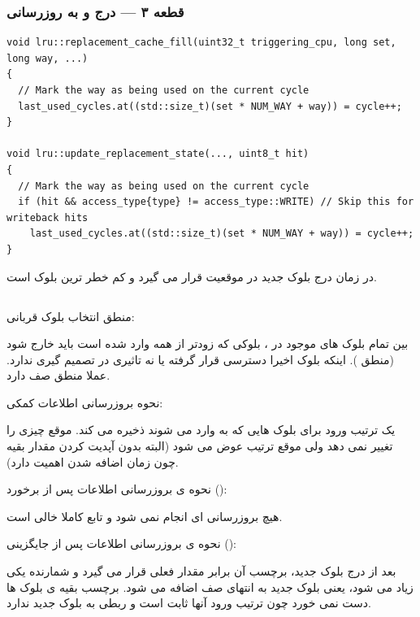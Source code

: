 \documentclass[12pt,a4paper]{article}
\begin{document}
\subsubsection{قطعه ۳ — درج و به روزرسانی}

\begin{latin}
\begin{lstlisting}
void lru::replacement_cache_fill(uint32_t triggering_cpu, long set, long way, ...)
{
  // Mark the way as being used on the current cycle
  last_used_cycles.at((std::size_t)(set * NUM_WAY + way)) = cycle++;
}

void lru::update_replacement_state(..., uint8_t hit)
{
  // Mark the way as being used on the current cycle
  if (hit && access_type{type} != access_type::WRITE) // Skip this for writeback hits
    last_used_cycles.at((std::size_t)(set * NUM_WAY + way)) = cycle++;
}
\end{lstlisting}
\end{latin}

در زمان درج بلوک جدید در موقعیت  قرار می گیرد و کم خطر ترین بلوک  است.

\subsection{}

منطق انتخاب بلوک قربانی:

بین تمام بلوک های موجود در ، بلوکی که زودتر از همه وارد شده است باید خارج شود (منطق ). اینکه بلوک اخیرا دسترسی قرار گرفته یا نه تاثیری در تصمیم گیری ندارد. عملا منطق صف دارد.

نحوه بروزرسانی اطلاعات کمکی:

یک ترتیب ورود برای بلوک هایی که به  وارد می شوند ذخیره می کند. موقع  چیزی را تغییر نمی دهد ولی موقع  ترتیب عوض می شود (البته بدون آپدیت کردن مقدار بقیه چون زمان اضافه شدن اهمیت دارد).

نحوه ی بروزرسانی اطلاعات پس از برخورد ():

هیچ بروزرسانی ای انجام نمی شود و تابع  کاملا خالی است.

نحوه ی بروزرسانی اطلاعات پس از جایگزینی ():

بعد از درج بلوک جدید، برچسب آن  برابر مقدار فعلی  قرار می گیرد و شمارنده یکی زیاد می شود، یعنی بلوک جدید به انتهای صف اضافه می شود. برچسب بقیه ی بلوک ها دست نمی خورد چون ترتیب ورود آنها ثابت است و ربطی به بلوک جدید ندارد.
\end{document}
